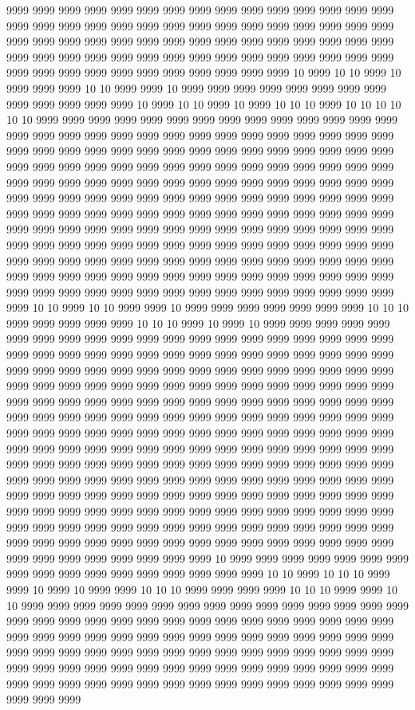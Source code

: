 9999 9999 9999 9999 9999 9999 9999 9999 9999 9999 9999 9999 9999 9999 9999 9999 9999 9999 9999 9999 9999 9999 9999 9999 9999 9999 9999 9999 9999 9999 9999 9999 9999 9999 9999 9999 9999 9999 9999 9999 9999 9999 9999 9999 9999 9999 9999 9999 9999 9999 9999 9999 9999 9999 9999 9999 9999 9999 9999 9999 9999 9999 9999 9999 9999 9999 9999 9999 9999 9999 9999 10 9999 10 10 9999 10 9999 9999 9999 10 10 9999 9999 10 9999 9999 9999 9999 9999 9999 9999 9999 9999 9999 9999 9999 9999 10 9999 10 10 9999 10 9999 10 10 10 9999 10 10 10 10 10 10 9999 9999 9999 9999 9999 9999 9999 9999 9999 9999 9999 9999 9999 9999 9999 9999 9999 9999 9999 9999 9999 9999 9999 9999 9999 9999 9999 9999 9999 9999 9999 9999 9999 9999 9999 9999 9999 9999 9999 9999 9999 9999 9999 9999 9999 9999 9999 9999 9999 9999 9999 9999 9999 9999 9999 9999 9999 9999 9999 9999 9999 9999 9999 9999 9999 9999 9999 9999 9999 9999 9999 9999 9999 9999 9999 9999 9999 9999 9999 9999 9999 9999 9999 9999 9999 9999 9999 9999 9999 9999 9999 9999 9999 9999 9999 9999 9999 9999 9999 9999 9999 9999 9999 9999 9999 9999 9999 9999 9999 9999 9999 9999 9999 9999 9999 9999 9999 9999 9999 9999 9999 9999 9999 9999 9999 9999 9999 9999 9999 9999 9999 9999 9999 9999 9999 9999 9999 9999 9999 9999 9999 9999 9999 9999 9999 9999 9999 9999 9999 9999 9999 9999 9999 9999 9999 9999 9999 9999 9999 9999 9999 9999 9999 9999 9999 9999 9999 9999 9999 9999 9999 9999 9999 9999 9999 9999 9999 9999 9999 9999 10 10 9999 10 10 9999 9999 10 9999 9999 9999 9999 9999 9999 9999 10 10 10 9999 9999 9999 9999 9999 10 10 10 9999 10 9999 10 9999 9999 9999 9999 9999 9999 9999 9999 9999 9999 9999 9999 9999 9999 9999 9999 9999 9999 9999 9999 9999 9999 9999 9999 9999 9999 9999 9999 9999 9999 9999 9999 9999 9999 9999 9999 9999 9999 9999 9999 9999 9999 9999 9999 9999 9999 9999 9999 9999 9999 9999 9999 9999 9999 9999 9999 9999 9999 9999 9999 9999 9999 9999 9999 9999 9999 9999 9999 9999 9999 9999 9999 9999 9999 9999 9999 9999 9999 9999 9999 9999 9999 9999 9999 9999 9999 9999 9999 9999 9999 9999 9999 9999 9999 9999 9999 9999 9999 9999 9999 9999 9999 9999 9999 9999 9999 9999 9999 9999 9999 9999 9999 9999 9999 9999 9999 9999 9999 9999 9999 9999 9999 9999 9999 9999 9999 9999 9999 9999 9999 9999 9999 9999 9999 9999 9999 9999 9999 9999 9999 9999 9999 9999 9999 9999 9999 9999 9999 9999 9999 9999 9999 9999 9999 9999 9999 9999 9999 9999 9999 9999 9999 9999 9999 9999 9999 9999 9999 9999 9999 9999 9999 9999 9999 9999 9999 9999 9999 9999 9999 9999 9999 9999 9999 9999 9999 9999 9999 9999 9999 9999 9999 9999 9999 9999 9999 9999 9999 9999 9999 9999 9999 9999 9999 9999 9999 9999 9999 9999 9999 9999 9999 9999 9999 9999 9999 9999 9999 9999 9999 9999 9999 9999 10 9999 9999 9999 9999 9999 9999 9999 9999 9999 9999 9999 9999 9999 9999 9999 9999 9999 10 10 9999 10 10 10 9999 9999 10 9999 10 9999 9999 10 10 10 9999 9999 9999 9999 10 10 10 9999 9999 10 10 9999 9999 9999 9999 9999 9999 9999 9999 9999 9999 9999 9999 9999 9999 9999 9999 9999 9999 9999 9999 9999 9999 9999 9999 9999 9999 9999 9999 9999 9999 9999 9999 9999 9999 9999 9999 9999 9999 9999 9999 9999 9999 9999 9999 9999 9999 9999 9999 9999 9999 9999 9999 9999 9999 9999 9999 9999 9999 9999 9999 9999 9999 9999 9999 9999 9999 9999 9999 9999 9999 9999 9999 9999 9999 9999 9999 9999 9999 9999 9999 9999 9999 9999 9999 9999 9999 9999 9999 9999 9999 9999 9999 9999 